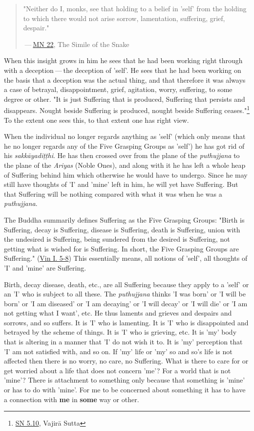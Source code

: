 \begin{quote}
"Neither do I, monks, see that holding to a belief in 'self' from the holding to which there would not arise sorrow, lamentation, suffering, grief, despair."

 --- \href{https://suttacentral.net/mn22/en/bodhi}{MN 22}, The Simile of the Snake
\end{quote}

When this insight grows in him he sees that he had been working right through with a deception --- the deception of 'self'. He sees that he had been working on the basis that a deception was the actual thing, and that therefore it was always a case of betrayal, disappointment, grief, agitation, worry, suffering, to some degree or other. "It is just Suffering that is produced, Suffering that persists and disappears. Nought beside Suffering is produced, nought beside Suffering ceases."\footnote{\href{https://suttacentral.net/sn5.10/en/bodhi}{SN 5.10}, Vajirā Sutta} To the extent one sees this, to that extent one has right view.

When the individual no longer regards anything as 'self' (which only means that he no longer regards any of the Five Grasping Groups as 'self') he has got rid of his \emph{sakkāyadiṭṭhi}. He has then crossed over from the plane of the \emph{puthujjana} to the plane of the \emph{Ariyas} (Noble Ones), and along with it he has left a whole heap of Suffering behind him which otherwise he would have to undergo. Since he may still have thoughts of 'I' and 'mine' left in him, he will yet have Suffering. But that Suffering will be nothing compared with what it was when he was a \emph{puthujjana}.

The Buddha summarily defines Suffering as the Five Grasping Groups: "Birth is Suffering, decay is Suffering, disease is Suffering, death is Suffering, union with the undesired is Suffering, being sundered from the desired is Suffering, not getting what is wished for is Suffering. In short, the Five Grasping Groups are Suffering." (\href{https://suttacentral.net/pli-tv-kd1/en/brahmali}{Vin I. 5-8}) This essentially means, all notions of 'self', all thoughts of 'I' and 'mine' are Suffering.

Birth, decay disease, death, etc., are all Suffering because they apply to a 'self' or an 'I' who is subject to all these. The \emph{puthujjana} thinks 'I was born' or 'I will be born' or 'I am diseased' or 'I am decaying' or 'I will decay' or 'I will die' or 'I am not getting what I want', etc. He thus laments and grieves and despairs and sorrows, and so suffers. It is 'I' who is lamenting. It is 'I' who is disappointed and betrayed by the scheme of things. It is 'I' who is grieving, etc. It is 'my' body that is altering in a manner that 'I' do not wish it to. It is 'my' perception that 'I' am not satisfied with, and so on. If 'my' life or 'my' so and so's life is not affected then there is no worry, no care, no Suffering. What is there to care for or get worried about a life that does not concern 'me'? For a world that is not 'mine'? There is attachment to something only because that something is 'mine' or has to do with 'mine'. For me to be concerned about something it has to have a connection with \textbf{me} in \textbf{some} way or other.

